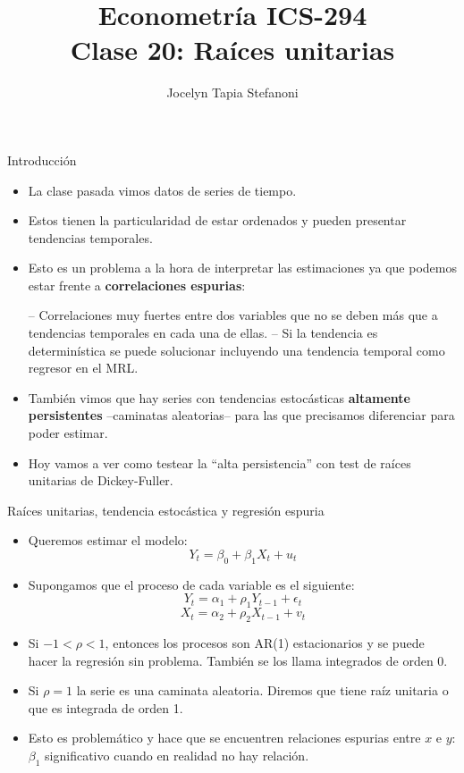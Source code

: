 \documentclass{beamer}
\title[ICS-162]{Econometría ICS-294\\ \small{Clase 20: Raíces unitarias}}
\author{Jocelyn Tapia Stefanoni}
\institute[USM]
{Universidad Técnica Federico Santa María\\ %
	\medskip
	\textit{} %
	
}
\date{}
\begin{document}
	
\begin{frame}
	\titlepage %


\end{frame}
\logo{}

\begin{frame}{Introducción}
    \begin{itemize}
        \item La clase pasada vimos datos de series de tiempo.
        \item Estos tienen la particularidad de estar ordenados y pueden presentar tendencias temporales.
        \item Esto es un problema a la hora de interpretar las estimaciones ya que podemos estar frente a \textbf{correlaciones espurias}:
        \begin{itemize}
            \newline -- Correlaciones muy fuertes entre dos variables que no se deben más que a tendencias temporales en cada una de ellas.
            \newline -- Si la tendencia es determinística se puede solucionar incluyendo una tendencia temporal como regresor en el MRL.
        \end{itemize}
        \item También vimos que hay series con tendencias estocásticas \textbf{altamente persistentes }–caminatas aleatorias– para las que precisamos diferenciar para poder estimar.
        \item Hoy vamos a ver como testear la “alta persistencia” con test de raíces unitarias de Dickey-Fuller.
    \end{itemize}
\end{frame}
\begin{frame}{Raíces unitarias, tendencia estocástica y regresión espuria}
    \begin{itemize}
        \item Queremos estimar el modelo:
        \[
        Y_t = \beta_0 + \beta_1 X_t + u_t
        \]
        \item Supongamos que el proceso de cada variable es el siguiente:
        \[
        Y_t = \alpha_1 + \rho_1 Y_{t-1} + \epsilon_t
        \]
        \[
        X_t = \alpha_2 + \rho_2 X_{t-1} + v_t
        \]
        \item Si $-1 < \rho < 1$, entonces los procesos son AR(1) estacionarios y se puede hacer la regresión sin problema. También se los llama integrados de orden 0.
        \item Si $\rho = 1$ la serie es una caminata aleatoria. Diremos que tiene raíz unitaria o que es integrada de orden 1.
        \item Esto es problemático y hace que se encuentren relaciones espurias entre $x$ e $y$: $\beta_1$ significativo cuando en realidad no hay relación.
    \end{itemize}
\end{frame}
\end{document}
